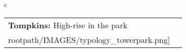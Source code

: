 \begin{table}[H]
        \begin{tabular}{c}
        \begin{tabular}{m{1.5in} m{2in}}
\textbf{Tompkins:} {High-rise in the park} & \texttt{[image: \\rootpath/IMAGES/typology\_towerpark.png]}
\end{tabular}\end{tabular}
        \end{table}